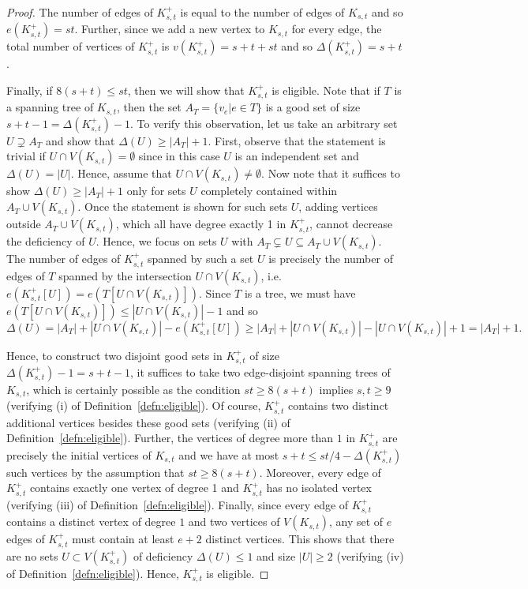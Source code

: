 \documentclass[11pt]{article}
\numberwithin{equation}{section}
\theoremstyle{plain}
\theoremstyle{remark}
\begin{document}
\begin{proof}
The number of edges of $K_{s, t}^+$ is equal to the number of edges of $K_{s, t}$ and so $e(K_{s, t}^+)=st$. Further, since we add a new vertex to $K_{s, t}$ for every edge, the total number of vertices of $K_{s, t}^+$ is $v(K_{s, t}^+)=s+t+st$ and so $\Delta(K_{s, t}^+)=s+t$.

Finally, if $8(s+t)\leq st$, then we will show that $K_{s, t}^+$ is eligible. Note that if $T$ is a spanning tree of $K_{s, t}$, then the set $A_T=\{v_e | e\in T\}$ is a good set of size $s+t-1=\Delta(K_{s, t}^+)-1$. To verify this observation, let us take an arbitrary set $U\supsetneq A_T$ and show that $\Delta(U)\geq |A_T|+1$. First, observe that the statement is trivial if $U\cap V(K_{s,t})=\emptyset$ since in this case $U$ is an independent set and $\Delta(U)=|U|$. Hence, assume that $U\cap V(K_{s,t})\neq \emptyset$. Now note that it suffices to show $\Delta(U)\geq |A_T|+1$ only for sets $U$ completely contained within $A_T\cup V(K_{s, t})$. Once the statement is shown for such sets $U$, adding vertices outside $A_T\cup V(K_{s, t})$, which all have degree exactly 1 in $K_{s, t}^+$, cannot decrease the deficiency of $U$. Hence, we focus on sets $U$ with $A_T\subsetneq U\subseteq A_T\cup V(K_{s, t})$. The number of edges of $K_{s, t}^+$ spanned by such a set $U$ is precisely the number of edges of $T$ spanned by the intersection $U\cap V(K_{s, t})$, i.e. $e(K_{s, t}^+[U])=e(T[U\cap V(K_{s, t})])$. Since $T$ is a tree, we must have $e(T[U\cap V(K_{s, t})])\leq |U\cap V(K_{s, t})|-1$ and so 
\[\Delta(U)=|A_T|+|U\cap V(K_{s, t})|-e(K_{s, t}^+[U])\geq |A_T|+|U\cap V(K_{s, t})|-|U\cap V(K_{s, t})|+1=|A_T|+1.\]

Hence, to construct two disjoint good sets in $K_{s, t}^+$ of size $\Delta(K_{s, t}^+)-1=s+t-1$, it suffices to take two edge-disjoint spanning trees of $K_{s, t}$, which is certainly possible as the condition $st\geq 8(s+t)$ implies $s, t\geq 9$ (verifying (i) of Definition~\ref{defn:eligible}). Of course, $K_{s, t}^+$ contains two distinct additional vertices besides these good sets (verifying (ii) of Definition~\ref{defn:eligible}). Further, the vertices of degree more than $1$ in $K_{s, t}^+$ are precisely the initial vertices of $K_{s, t}$ and we have at most $s+t\leq st/4-\Delta(K_{s, t}^+)$ such vertices by the assumption that $st\geq 8(s+t)$. Moreover, every edge of $K_{s, t}^+$ contains exactly one vertex of degree 1 and $K_{s,t}^+$ has no isolated vertex (verifying (iii) of Definition~\ref{defn:eligible}). Finally, since every edge of $K_{s, t}^+$ contains a distinct vertex of degree $1$ and two vertices of $V(K_{s, t})$, any set of $e$ edges of $K_{s, t}^+$ must contain at least $e+2$ distinct vertices. This shows that there are no sets $U\subset V(K_{s, t}^+)$ of deficiency $\Delta(U)\leq 1$ and size $|U|\geq 2$ (verifying (iv) of Definition~\ref{defn:eligible}). Hence, $K_{s, t}^+$ is eligible.
\end{proof}
\end{document}
